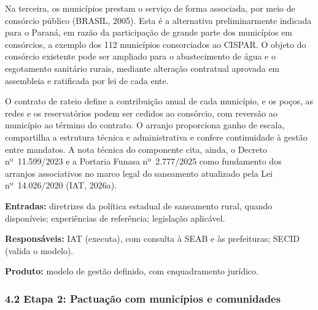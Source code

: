 Na terceira, os municípios prestam o serviço de forma associada, por meio de consórcio público (BRASIL, 2005). Esta é a alternativa preliminarmente indicada para o Paraná, em razão da participação de grande parte dos municípios em consórcios, a exemplo dos 112 municípios consorciados ao CISPAR. O objeto do consórcio existente pode ser ampliado para o abastecimento de água e o esgotamento sanitário rurais, mediante alteração contratual aprovada em assembleia e ratificada por lei de cada ente.

O contrato de rateio define a contribuição anual de cada município, e os poços, as redes e os reservatórios podem ser cedidos ao consórcio, com reversão ao município ao término do contrato. O arranjo proporciona ganho de escala, compartilha a estrutura técnica e administrativa e confere continuidade à gestão entre mandatos. A nota técnica do componente cita, ainda, o Decreto nº~11.599/2023 e a Portaria Funasa nº~2.777/2025 como fundamento dos arranjos associativos no marco legal do saneamento atualizado pela Lei nº~14.026/2020 (IAT, 2026a).



\textbf{Entradas:} diretrizes da política estadual de saneamento rural, quando disponíveis; experiências de referência; legislação aplicável.

\textbf{Responsáveis:} IAT (executa), com consulta à SEAB e às prefeituras; SECID (valida o modelo).

\textbf{Produto:} modelo de gestão definido, com enquadramento jurídico.


\subsubsection*{4.2 Etapa 2: Pactuação com municípios e comunidades}

